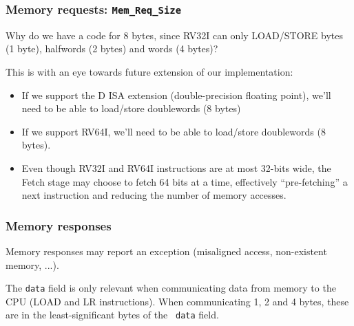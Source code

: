 \begin{frame}[fragile]
\frametitle{Memory requests: {\tt Mem\_Req\_Size}}

\footnotesize


\PAUSE{\vspace{2ex}}

Why do we have a code for 8 bytes, since RV32I can only LOAD/STORE
bytes (1 byte), halfwords (2 bytes) and words (4 bytes)?

\PAUSE{\vspace{2ex}}

This is with an eye towards future extension of our implementation:

\begin{itemize}

 \item If we support the D ISA extension (double-precision floating
       point), we'll need to be able to load/store doublewords (8 bytes)

 \item If we support RV64I, we'll need to be able to load/store doublewords (8 bytes).

 \PAUSE{\vspace{2ex}}

 \item Even though RV32I and RV64I instructions are at most 32-bits
       wide, the Fetch stage may choose to fetch 64 bits at a time,
       effectively ``pre-fetching'' a next instruction and reducing
       the number of memory accesses.

\end{itemize}

\end{frame}


\begin{frame}[fragile]
\frametitle{Memory responses}

\footnotesize

Memory responses may report an exception (misaligned access, non-existent memory, ...).

\vspace{1ex}


\vspace{4ex}


\vspace{1ex}

The {\tt data} field is only relevant when communicating data from
memory to the CPU (LOAD and LR instructions).  When communicating 1, 2
and 4 bytes, these are in the least-significant bytes of the {\tt
data} field.

\end{frame}

